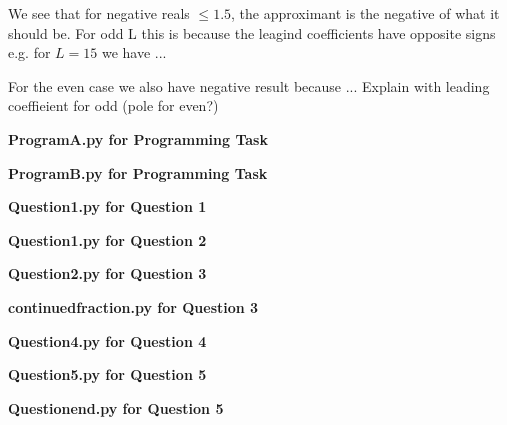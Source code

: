 \documentclass[12pt, a4paper]{article}
\begin{document}
We see that for negative reals $\leq 1.5$, the approximant is the negative of what it should be.
For odd L this is because the leagind coefficients have opposite signs e.g. for $L = 15$ we have ...

For the even case we also have negative result because ...
Explain with leading coeffieient for odd (pole for even?)


\pagebreak
\textbf{Program\textunderscore A.py for Programming Task}\centering\label{Program_A}

\vspace{2cm}

\pagebreak
\textbf{Program\textunderscore B.py for Programming Task}\centering\label{Program_B}

\vspace{2cm}

\pagebreak
\textbf{Question\textunderscore 1.py for Question 1}\centering\label{Question_1}

\vspace{2cm}

\pagebreak
\textbf{Question\textunderscore 1.py for Question 2}\centering\label{Question_2}

\vspace{2cm}

\pagebreak
\textbf{Question\textunderscore 2.py for Question 3}\centering\label{Question_3}

\vspace{2cm}

\pagebreak
\textbf{continued\textunderscore fraction.py for Question 3}\centering\label{continued_fraction}

\vspace{2cm}

\pagebreak
\textbf{Question\textunderscore 4.py for Question 4}\centering\label{Question_4}

\vspace{2cm}

\pagebreak
\textbf{Question\textunderscore 5.py for Question 5}\centering\label{Question_5}

\vspace{2cm}

\pagebreak
\textbf{Question\textunderscore end.py for Question 5}\centering\label{Question_5_end}

\vspace{2cm}
\end{document}
